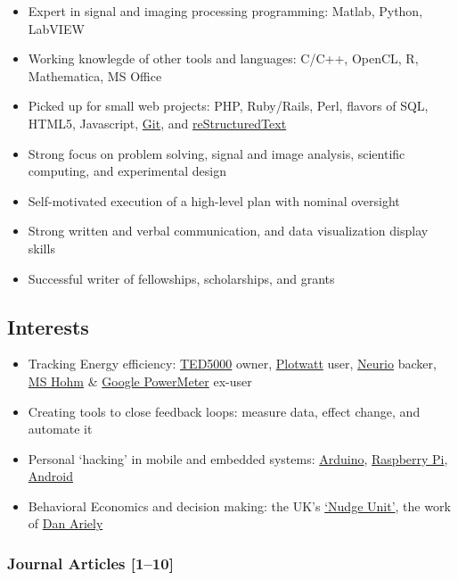 \documentclass[]{article}
\begin{document}
\begin{itemize}
\itemsep1pt\parskip0pt
\item
  Expert in signal and imaging processing programming: Matlab, Python,
  LabVIEW
\item
  Working knowlegde of other tools and languages: C/C++, OpenCL, R,
  Mathematica, MS Office
\item
  Picked up for small web projects: PHP, Ruby/Rails, Perl, flavors of
  SQL, HTML5, Javascript, \href{http://git-scm.com/}{Git}, and
  \href{http://docutils.sf.net/rst.html}{reStructuredText}
\item
  Strong focus on problem solving, signal and image analysis, scientific
  computing, and experimental design
\item
  Self-motivated execution of a high-level plan with nominal oversight
\item
  Strong written and verbal communication, and data visualization
  display skills
\item
  Successful writer of fellowships, scholarships, and grants
\end{itemize}

\subsection{Interests}\label{interests}

\begin{itemize}
\itemsep1pt\parskip0pt
\item
  Tracking Energy efficiency:
  \href{http://www.theenergydetective.com/}{TED5000} owner,
  \href{plotwatt.com}{Plotwatt} user, \href{https://neur.io/}{Neurio}
  backer, \href{en.wikipedia.org/wiki/Hohm}{MS Hohm} \&
  \href{google.com/powermeter/about/}{Google PowerMeter} ex-user
\item
  Creating tools to close feedback loops: measure data, effect change,
  and automate it
\item
  Personal `hacking' in mobile and embedded systems:
  \href{http://www.arduino.cc/}{Arduino},
  \href{http://www.raspberrypi.org/}{Raspberry Pi},
  \href{http://www.android.com/}{Android}
\item
  Behavioral Economics and decision making: the UK's
  \href{https://www.gov.uk/government/organisations/behavioural-insights-team}{`Nudge
  Unit'}, the work of \href{http://danariely.com/}{Dan Ariely}
\end{itemize}

\subsubsection{Journal Articles
{[}1--10{]}}\label{journal-articles-fahey2008afahey2008cnightingale2008nightingale2009wolf2011eyerly2012hollender2013hollender2013bpatel2014eyerly2014}
\end{document}
